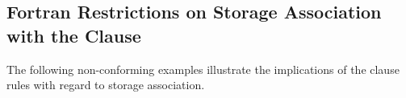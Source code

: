 \pagebreak
\begin{fortranspecific}[4ex]
\section{Fortran Restrictions on Storage Association with the  Clause}
\label{sec:fort_sa_private}

The following non-conforming examples illustrate the implications of the  
clause rules with regard to storage association. 





\end{fortranspecific}

